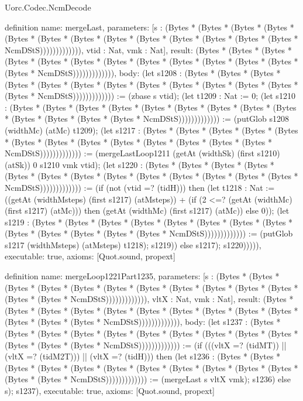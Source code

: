 \begin{lexlean}{Uorc.Codec.NcmDecode}
\begin{semanticmodule}
definition{
  name: mergeLast,
  parameters: [s : (Bytes * (Bytes * (Bytes * (Bytes * (Bytes * (Bytes * (Bytes * (Bytes * (Bytes * (Bytes * (Bytes * (Bytes * (Bytes * NcmDStS))))))))))))), vtid : Nat, vmk : Nat],
  result: (Bytes * (Bytes * (Bytes * (Bytes * (Bytes * (Bytes * (Bytes * (Bytes * (Bytes * (Bytes * (Bytes * (Bytes * (Bytes * NcmDStS))))))))))))),
  body: (let s1208 : (Bytes * (Bytes * (Bytes * (Bytes * (Bytes * (Bytes * (Bytes * (Bytes * (Bytes * (Bytes * (Bytes * (Bytes * (Bytes * NcmDStS))))))))))))) := (zbase s vtid); (let t1209 : Nat := 0; (let s1210 : (Bytes * (Bytes * (Bytes * (Bytes * (Bytes * (Bytes * (Bytes * (Bytes * (Bytes * (Bytes * (Bytes * (Bytes * (Bytes * NcmDStS))))))))))))) := (putGlob s1208 (widthMc) (atMc) t1209); (let s1217 : (Bytes * (Bytes * (Bytes * (Bytes * (Bytes * (Bytes * (Bytes * (Bytes * (Bytes * (Bytes * (Bytes * (Bytes * (Bytes * NcmDStS))))))))))))) := (mergeLastLoop1211 (getAt (widthSk) (first s1210) (atSk)) 0 s1210 vmk vtid); (let s1220 : (Bytes * (Bytes * (Bytes * (Bytes * (Bytes * (Bytes * (Bytes * (Bytes * (Bytes * (Bytes * (Bytes * (Bytes * (Bytes * NcmDStS))))))))))))) := (if (not (vtid =? (tidH))) then (let t1218 : Nat := ((getAt (widthMsteps) (first s1217) (atMsteps)) + (if (2 <=? (getAt (widthMc) (first s1217) (atMc))) then (getAt (widthMc) (first s1217) (atMc)) else 0)); (let s1219 : (Bytes * (Bytes * (Bytes * (Bytes * (Bytes * (Bytes * (Bytes * (Bytes * (Bytes * (Bytes * (Bytes * (Bytes * (Bytes * NcmDStS))))))))))))) := (putGlob s1217 (widthMsteps) (atMsteps) t1218); s1219)) else s1217); s1220))))),
  executable: true,
  axioms: [Quot.sound, propext]
}

definition{
  name: mergeLoop1221Part1235,
  parameters: [s : (Bytes * (Bytes * (Bytes * (Bytes * (Bytes * (Bytes * (Bytes * (Bytes * (Bytes * (Bytes * (Bytes * (Bytes * (Bytes * NcmDStS))))))))))))), vltX : Nat, vmk : Nat],
  result: (Bytes * (Bytes * (Bytes * (Bytes * (Bytes * (Bytes * (Bytes * (Bytes * (Bytes * (Bytes * (Bytes * (Bytes * (Bytes * NcmDStS))))))))))))),
  body: (let s1237 : (Bytes * (Bytes * (Bytes * (Bytes * (Bytes * (Bytes * (Bytes * (Bytes * (Bytes * (Bytes * (Bytes * (Bytes * (Bytes * NcmDStS))))))))))))) := (if (((vltX =? (tidMT)) || (vltX =? (tidM2T))) || (vltX =? (tidH))) then (let s1236 : (Bytes * (Bytes * (Bytes * (Bytes * (Bytes * (Bytes * (Bytes * (Bytes * (Bytes * (Bytes * (Bytes * (Bytes * (Bytes * NcmDStS))))))))))))) := (mergeLast s vltX vmk); s1236) else s); s1237),
  executable: true,
  axioms: [Quot.sound, propext]
}


\end{semanticmodule}
\end{lexlean}
